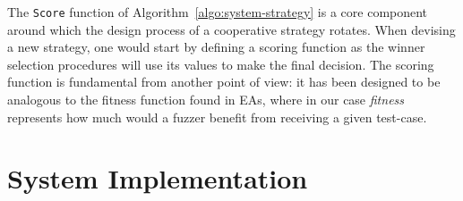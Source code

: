 The \texttt{Score} function of Algorithm~\ref{algo:system-strategy} is a core
component around which the design process of a cooperative strategy rotates.
When devising a new strategy, one would start by defining a scoring function as
the winner selection procedures will use its values to make the final decision.
The scoring function is fundamental from another point of view: it has been
designed to be analogous to the fitness function found in \acp{EA}, where in our
case \emph{fitness} represents how much would a fuzzer benefit from receiving a
given test-case.



\section{System Implementation}


